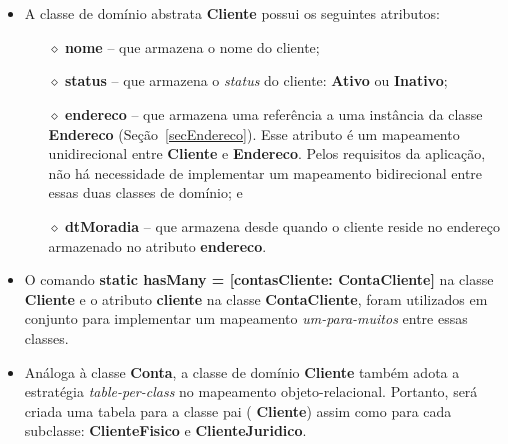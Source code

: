 \hspace{1cm}\\
\hspace{1cm}\\

\begin{itemize}

\item A classe de domínio abstrata {\bf Cliente} possui os seguintes atributos:

\vspace{0.5cm}

\begin{itemize}

\item[$\diamond$] {\bf nome} -- que armazena o nome do cliente; 

\vspace{0.5cm}

\item[$\diamond$] {\bf status}  -- que armazena o {\it  status} do cliente: {\bf
  Ativo} ou {\bf Inativo};

\vspace{0.5cm}

\item[$\diamond$] {\bf endereco} -- que  armazena uma referência a uma instância
  da  classe  {\bf  Endereco}  (Seção~\ref{secEndereco}).  Esse  atributo  é  um
  mapeamento  unidirecional  entre  {\bf   Cliente}  e  {\bf  Endereco}.   Pelos
  requisitos  da aplicação,  não  há necessidade  de  implementar um  mapeamento
  bidirecional entre essas duas classes de domínio; e

\vspace{0.5cm}

\item[$\diamond$] {\bf dtMoradia} -- que  armazena desde quando o cliente reside
  no endereço armazenado no atributo {\bf endereco}.

\end{itemize}

\vspace{0.5cm}

\item O comando  {\bf static hasMany = [contasCliente:  ContaCliente]} na classe
  {\bf Cliente} e  o atributo {\bf cliente} na  classe {\bf ContaCliente}, foram
  utilizados  em conjunto  para implementar  um mapeamento  {\em um-para-muitos}
  entre essas classes.

\vspace{0.5cm}

\item Análoga  à classe {\bf  Conta}, a classe  de domínio {\bf  Cliente} também
  adota     a     estratégia     {\it     table-per-class}     no     mapeamento
  objeto-relacional. Portanto,  será criada uma  tabela para a classe  pai ({\bf
    Cliente})  assim  como  para  cada  subclasse: {\bf  ClienteFisico}  e  {\bf
    ClienteJuridico}.

\end{itemize}

